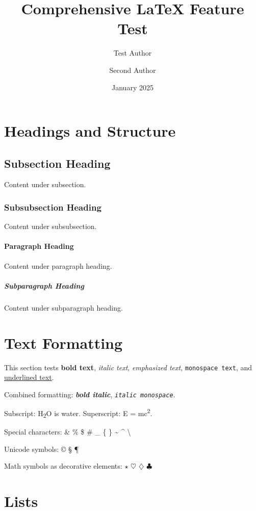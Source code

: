 \documentclass[12pt,twocolumn]{article}
\title{Comprehensive \LaTeX{} Feature Test}
\author{Test Author \and Second Author}
\date{January 2025}
\begin{document}
\maketitle
\tableofcontents

\section{Headings and Structure}

\subsection{Subsection Heading}
Content under subsection.

\subsubsection{Subsubsection Heading}
Content under subsubsection.

\paragraph{Paragraph Heading}
Content under paragraph heading.

\subparagraph{Subparagraph Heading}
Content under subparagraph heading.

\section{Text Formatting}

This section tests \textbf{bold text}, \textit{italic text}, \emph{emphasized text},
\texttt{monospace text}, and \underline{underlined text}.

Combined formatting: \textbf{\textit{bold italic}}, \textit{\texttt{italic monospace}}.

Subscript: H\textsubscript{2}O is water. Superscript: E = mc\textsuperscript{2}.

Special characters: \& \% \$ \# \_ \{ \} \~{} \^{} \textbackslash

Unicode symbols: \copyright{} \dag{} \ddag{} \S{} \P{}

Math symbols as decorative elements: $\star$ $\heartsuit$ $\diamondsuit$ $\clubsuit$

\section{Lists}
\end{document}
